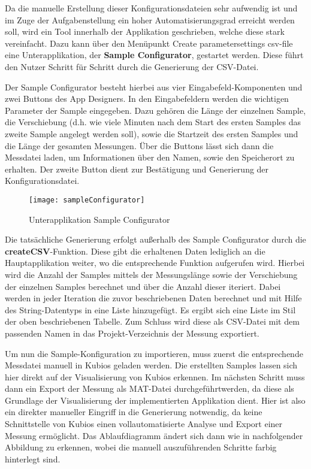 Da die manuelle Erstellung dieser Konfigurationsdateien sehr aufwendig ist und im Zuge der Aufgabenstellung ein hoher Automatisierungsgrad erreicht werden soll, wird ein Tool innerhalb der Applikation geschrieben, welche diese stark vereinfacht. Dazu kann über den Menüpunkt \glqq Create parametersettings csv-file\grqq{} eine Unterapplikation, der \textbf{Sample Configurator}, gestartet werden. Diese führt den Nutzer Schritt für Schritt durch die Generierung der \acs{CSV}-Datei.   

Der Sample Configurator besteht hierbei aus vier Eingabefeld-Komponenten und zwei Buttons des App Designers. In den Eingabefeldern werden die wichtigen Parameter der Sample eingegeben. Dazu gehören die Länge der einzelnen Sample, die Verschiebung (d.h. wie viele Minuten nach dem Start des ersten Samples das zweite Sample angelegt werden soll), sowie die Startzeit des ersten Samples und die Länge der gesamten Messungen. Über die Buttons lässt sich dann die Messdatei laden, um Informationen über den Namen, sowie den Speicherort zu erhalten. Der zweite Button dient zur Bestätigung und Generierung der Konfigurationsdatei.

\begin{figure}[H]
	\centering
	\texttt{[image: sampleConfigurator]}
	\caption{Unterapplikation Sample Configurator}
	\label{fig:sampleConfigurator}
\end{figure}

Die tatsächliche Generierung erfolgt außerhalb des Sample Configurator durch die \textbf{createCSV}-Funktion. Diese gibt die erhaltenen Daten lediglich an die Hauptapplikation weiter, wo die entsprechende Funktion aufgerufen wird. Hierbei wird die Anzahl der Samples mittels der Messungslänge sowie der Verschiebung der einzelnen Samples berechnet und über die Anzahl dieser iteriert. Dabei werden in jeder Iteration die zuvor beschriebenen Daten berechnet und mit Hilfe des String-Datentyps in eine Liste hinzugefügt. Es ergibt sich eine Liste im Stil der oben beschriebenen Tabelle. Zum Schluss wird diese als \acs{CSV}-Datei mit dem passenden Namen in das Projekt-Verzeichnis der Messung exportiert.

\begin{minipage}{\linewidth}

\end{minipage}

Um nun die Sample-Konfiguration zu importieren, muss zuerst die entsprechende Messdatei manuell in Kubios geladen werden. Die erstellten Samples lassen sich hier direkt auf der Visualisierung von Kubios erkennen. Im nächsten Schritt muss dann ein Export der Messung als MAT-Datei durchgeführtwerden, da diese als Grundlage der Visualisierung der implementierten Applikation dient. Hier ist also ein direkter manueller Eingriff in die Generierung notwendig, da keine Schnittstelle von Kubios einen vollautomatisierte Analyse und Export einer Messung ermöglicht. Das Ablaufdiagramm ändert sich dann wie in nachfolgender Abbildung zu erkennen, wobei die manuell auszuführenden Schritte farbig hinterlegt sind.

